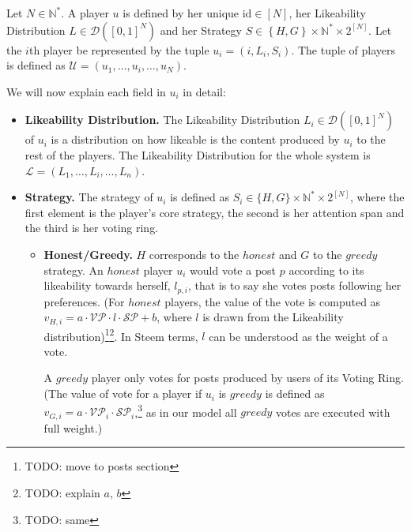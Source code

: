     \begin{definition}[Player]
      Let $N \in \mathbb{N}^{*}$. A player $u$ is defined by her unique
      $\mathrm{id} \in \left[N\right]$, her Likeability Distribution $L \in
      \mathcal{D} \left(\left[0, 1\right]^N\right)$ and her Strategy $S \in
      \left\{H, G\right\} \times \mathbb{N}^* \times 2^{\left[N\right]}$. Let
      the $i$th player be represented by the tuple $u_i = \left(i, L_i,
      S_i\right)$. The tuple of players is defined as $\mathcal{U} = \left(u_1,
      \dots, u_i, \dots, u_N\right)$.

      We will now explain each field in $u_i$ in detail:
      \begin{itemize}
        \item \textbf{Likeability Distribution.} The Likeability Distribution
        $L_i \in \mathcal{D}\left([0,1]^N\right)$ of $u_i$ is a distribution on
        how likeable is the content produced by $u_i$ to the rest of the
        players. The Likeability Distribution for the whole system is
        $\mathcal{L} = \left(L_1, \dots, L_i, \dots, L_n\right)$.

        \item \textbf{Strategy.} The strategy of $u_i$ is defined as $S_i \in
        \lbrace H, G \rbrace \times \mathbb{N}^* \times 2^{\left[N\right]}$,
        where the first element is the player's core strategy, the second is her
        attention span and the third is her voting ring.
        \begin{itemize}
          \item \textbf{Honest/Greedy.} $H$ corresponds to the $honest$ and $G$
          to the $greedy$ strategy. An $honest$ player $u_i$ would vote a post
          $p$ according to its likeability towards herself, $l_{p, i}$, that is
          to say she votes posts following her preferences. (For $honest$
          players, the value of the vote is computed as $v_{H,i} = a \cdot
          \mathcal{VP} \cdot l \cdot \mathcal{SP} + b$, where $l$ is drawn from
          the Likeability distribution)\footnote{TODO: move to posts
          section}\fnmsep\footnote{TODO: explain $a$, $b$}. In Steem terms, $l$
          can be understood as the weight of a vote.

          A $greedy$ player only votes for posts produced by users of its Voting
          Ring. (The value of vote for a player if $u_i$ is $greedy$ is defined
          as $v_{G,i} = a \cdot \mathcal{VP}_i \cdot
          \mathcal{SP}_i$,\footnote{TODO: same} as in our model all $greedy$
          votes are executed with full weight.)


\end{itemize}
\end{itemize}
\end{definition}
